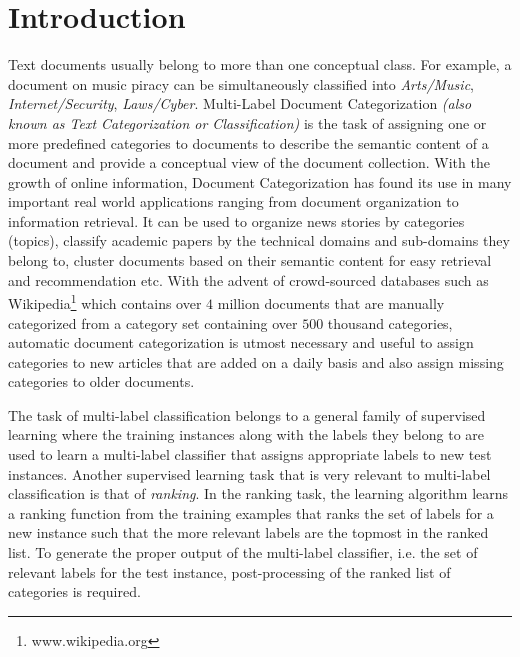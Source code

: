 \chapter{Introduction}
\label{chapter:introduction}


Text documents usually belong to more than one conceptual class. For example, a document on music piracy can be simultaneously classified into \emph{Arts/Music}, \emph{Internet/Security}, \emph{Laws/Cyber}.     Multi-Label Document Categorization \emph{(also known as Text Categorization or Classification)} is the task of assigning one or more predefined categories to documents to describe the semantic content of a document and provide a conceptual view of the document collection.
With the growth of online information, Document Categorization has found its use in many important real world applications ranging from document organization to information retrieval. It can be used to organize news stories by categories (topics), classify academic papers by the technical domains and sub-domains they belong to, cluster documents based on their semantic content for easy retrieval and recommendation etc.
With the advent of crowd-sourced databases such as Wikipedia\footnote{www.wikipedia.org} which contains over $4$ million documents that are manually categorized from a category set containing over $500$ thousand categories, automatic document categorization is utmost necessary and useful to assign categories to new articles that are added on a daily basis and also assign missing categories to older documents.

The task of multi-label classification belongs to a general family of supervised learning where the training instances along with the labels they belong to are used to learn a multi-label classifier that assigns appropriate labels to new test instances. 
Another supervised learning task that is very relevant to multi-label classification is that of \emph{ranking}. In the ranking task, the learning algorithm learns a ranking function from the training examples that ranks the set of labels for a new instance such that the more relevant labels are the topmost in the ranked list. 
To generate the proper output of the multi-label classifier, i.e. the set of relevant labels for the test instance, post-processing of the ranked list of categories is required.

